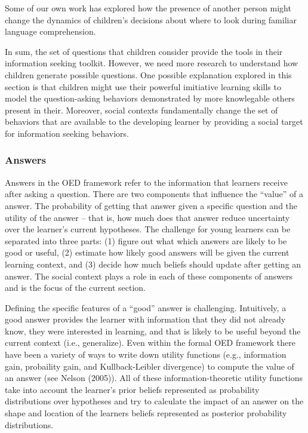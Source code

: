 \documentclass[english,floatsintext,man]{apa6}
\theoremstyle{definition}
\theoremstyle{definition}
\theoremstyle{definition}
\theoremstyle{remark}
\begin{document}
Some of our own work has explored how the presence of another person
might change the dynamics of children's decisions about where to look
during familiar language comprehension.

In sum, the set of questions that children consider provide the tools in
their information seeking toolkit. However, we need more research to
understand how children generate possible questions. One possible
explanation explored in this section is that children might use their
powerful imitiative learning skills to model the question-asking
behaviors demonstrated by more knowlegable others present in their.
Moreover, social contexts fundamentally change the set of behaviors that
are available to the developing learner by providing a social target for
information seeking behaviors.

\subsubsection{Answers}\label{answers}

Answers in the OED framework refer to the information that learners
receive after asking a question. There are two components that influence
the \enquote{value} of a answer. The probability of getting that answer
given a specific question and the utility of the answer -- that is, how
much does that answer reduce uncertainty over the learner's current
hypotheses. The challenge for young learners can be separated into three
parts: (1) figure out what which answers are likely to be good or
useful, (2) estimate how likely good answers will be given the current
learning context, and (3) decide how much beliefs should update after
getting an answer. The social context plays a role in each of these
components of answers and is the focus of the current section.

Defining the specific features of a \enquote{good} answer is
challenging. Intuitively, a good answer provides the learner with
information that they did not already know, they were interested in
learning, and that is likely to be useful beyond the current context
(i.e., generalize). Even within the formal OED framework there have been
a variety of ways to write down utility functions (e.g., information
gain, probaility gain, and Kullback-Leibler divergence) to compute the
value of an answer (see Nelson (2005)). All of these
information-theoretic utility functions take into account the learner's
prior beliefs represented as probability distributions over hypotheses
and try to calculate the impact of an answer on the shape and location
of the learners beliefs represented as posterior probability
distributions.
\end{document}
